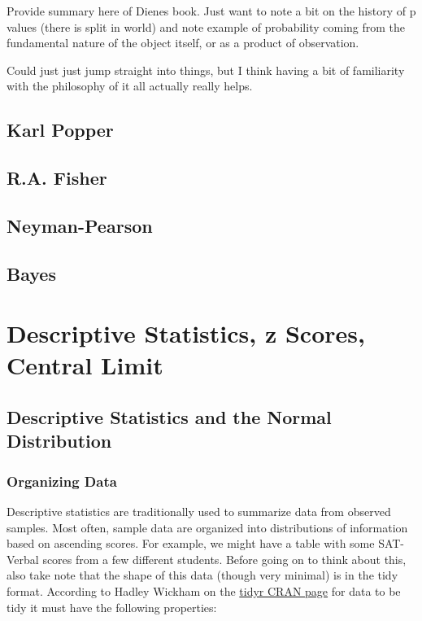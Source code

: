 \documentclass[]{book}
\theoremstyle{definition}
\theoremstyle{definition}
\theoremstyle{definition}
\theoremstyle{remark}
\begin{document}
Provide summary here of Dienes book. Just want to note a bit on the
history of p values (there is split in world) and note example of
probability coming from the fundamental nature of the object itself, or
as a product of observation.

Could just just jump straight into things, but I think having a bit of
familiarity with the philosophy of it all actually really helps.

\section{Karl Popper}\label{karl-popper}

\section{R.A. Fisher}\label{r.a.-fisher}

\section{Neyman-Pearson}\label{neyman-pearson}

\section{Bayes}\label{bayes}

\chapter{Descriptive Statistics, z Scores, Central
Limit}\label{descriptive-statistics-z-scores-central-limit}

\section{Descriptive Statistics and the Normal
Distribution}\label{descriptive-statistics-and-the-normal-distribution}

\subsection{Organizing Data}\label{organizing-data}

Descriptive statistics are traditionally used to summarize data from
observed samples. Most often, sample data are organized into
distributions of information based on ascending scores. For example, we
might have a table with some SAT-Verbal scores from a few different
students. Before going on to think about this, also take note that the
shape of this data (though very minimal) is in the tidy format.
According to Hadley Wickham on the
\href{https://cran.r-project.org/web/packages/tidyr/vignettes/tidy-data.html}{tidyr
CRAN page} for data to be tidy it must have the following properties:
\end{document}
